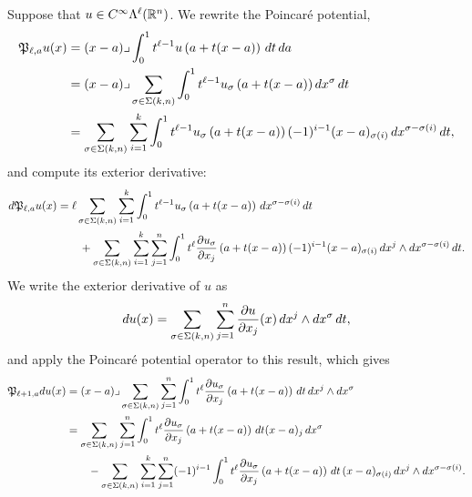 \documentclass[10pt,letterpaper]{article}
\begin{document}
Suppose that $u \in C^{\infty}\Lambda^{\ell}({\mathbb R}^n)$.
We rewrite the Poincar\'e potential,
\begin{align*}
    {\mathfrak P}_{\ell,a} u(x) 
    &= 
    (x-a)\lrcorner \int_{0}^{1} t^{\ell-1} u\left(a+t(x-a)\right)\,dt\,da\;
    \\&
    = 
    (x-a)\lrcorner 
    \sum_{\sigma \in \Sigma(k,n)}
    \int_{0}^{1} 
    t^{\ell-1} u_{\sigma}\left(a+t(x-a)\right) dx^{\sigma} \,dt 
    \\&
    = 
    \sum_{\sigma \in \Sigma(k,n)} \sum_{i=1}^{k}
    \int_{0}^{1} 
    t^{\ell-1} u_{\sigma}\left(a+t(x-a)\right) (-1)^{i-1} (x-a)_{\sigma(i) } \,dx^{\sigma-\sigma(i)} \,dt 
    ,
\end{align*}
and compute its exterior derivative:
\begin{align*}
    d {\mathfrak P}_{\ell,a} u(x) 
    &= 
    \ell
    \sum_{\sigma \in \Sigma(k,n)} \sum_{i=1}^{k}
    \int_{0}^{1} 
    t^{\ell-1} u_{\sigma}\left(a+t(x-a)\right) \,dx^{\sigma-\sigma(i)} \,dt 
    \\&\qquad
    + 
    \sum_{\sigma \in \Sigma(k,n)} \sum_{i=1}^{k} \sum_{j=1}^{n}
    \int_{0}^{1} 
    t^{\ell} \frac{ \partial u_{\sigma} }{\partial x_{j}}\left(a+t(x-a)\right) (-1)^{i-1} (x-a)_{\sigma(i) } \,dx^{j} \wedge dx^{\sigma-\sigma(i)} \,dt 
    .
\end{align*}
We write the exterior derivative of $u$ as 
\begin{align*}
    d u(x)
    =
    \sum_{\sigma \in \Sigma(k,n)} \sum_{j=1}^{n}
    \frac{ \partial u }{\partial x_{j}}(x) \,dx^{j} \wedge dx^{\sigma} \,dt 
    ,
\end{align*}
and apply the Poincar\'e potential operator to this result, which gives 
\begin{align*}
    {\mathfrak P}_{\ell+1,a} d u(x)
    &=
    (x-a)\lrcorner 
    \sum_{\sigma \in \Sigma(k,n)} \sum_{j=1}^{n}
    \int_{0}^{1} t^{\ell} \frac{ \partial u_{\sigma} }{\partial x_{j}}\left(a+t(x-a)\right) \,dt 
    \,dx^{j} \wedge dx^{\sigma}
    \\&
    = 
    \sum_{\sigma \in \Sigma(k,n)} \sum_{j=1}^{n}
    \int_{0}^{1} t^{\ell} \frac{ \partial u_{\sigma} }{\partial x_{j}}\left(a+t(x-a)\right) \,dt (x-a)_{j}
    \,dx^{\sigma}
    \\&\qquad 
    - 
    \sum_{\sigma \in \Sigma(k,n)} \sum_{i=1}^{k} \sum_{j=1}^{n}
    (-1)^{i-1}
    \int_{0}^{1} t^{\ell} \frac{ \partial u_{\sigma} }{\partial x_{j}}\left(a+t(x-a)\right) \,dt 
    \,(x-a)_{\sigma(i)} 
    \,dx^{j} \wedge dx^{\sigma-\sigma(i)}
    .
\end{align*}
\end{document}
